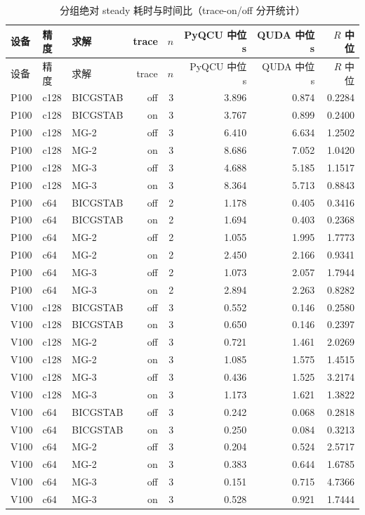 \begin{longtable}{@{}lllrrrrr@{}}
\caption{分组绝对 steady 耗时与时间比（trace-on/off 分开统计）}\label{tab:group-times}\\
\toprule
设备 & 精度 & 求解 & trace & $n$ & PyQCU 中位 s & QUDA 中位 s & $R$ 中位 \\
\midrule
\endfirsthead
\toprule
设备 & 精度 & 求解 & trace & $n$ & PyQCU 中位 s & QUDA 中位 s & $R$ 中位 \\
\midrule
\endhead
P100 & c128 & BICGSTAB & off & 3 & 3.896 & 0.874 & 0.2284 \\
P100 & c128 & BICGSTAB & on & 3 & 3.767 & 0.899 & 0.2400 \\
P100 & c128 & MG-2 & off & 3 & 6.410 & 6.634 & 1.2502 \\
P100 & c128 & MG-2 & on & 3 & 8.686 & 7.052 & 1.0420 \\
P100 & c128 & MG-3 & off & 3 & 4.688 & 5.185 & 1.1517 \\
P100 & c128 & MG-3 & on & 3 & 8.364 & 5.713 & 0.8843 \\
P100 & c64 & BICGSTAB & off & 2 & 1.178 & 0.405 & 0.3416 \\
P100 & c64 & BICGSTAB & on & 2 & 1.694 & 0.403 & 0.2368 \\
P100 & c64 & MG-2 & off & 2 & 1.055 & 1.995 & 1.7773 \\
P100 & c64 & MG-2 & on & 2 & 2.450 & 2.166 & 0.9341 \\
P100 & c64 & MG-3 & off & 2 & 1.073 & 2.057 & 1.7944 \\
P100 & c64 & MG-3 & on & 2 & 2.894 & 2.263 & 0.8282 \\
V100 & c128 & BICGSTAB & off & 3 & 0.552 & 0.146 & 0.2580 \\
V100 & c128 & BICGSTAB & on & 3 & 0.650 & 0.146 & 0.2397 \\
V100 & c128 & MG-2 & off & 3 & 0.721 & 1.461 & 2.0269 \\
V100 & c128 & MG-2 & on & 3 & 1.085 & 1.575 & 1.4515 \\
V100 & c128 & MG-3 & off & 3 & 0.436 & 1.525 & 3.2174 \\
V100 & c128 & MG-3 & on & 3 & 1.173 & 1.621 & 1.3822 \\
V100 & c64 & BICGSTAB & off & 3 & 0.242 & 0.068 & 0.2818 \\
V100 & c64 & BICGSTAB & on & 3 & 0.250 & 0.084 & 0.3213 \\
V100 & c64 & MG-2 & off & 3 & 0.204 & 0.524 & 2.5717 \\
V100 & c64 & MG-2 & on & 3 & 0.383 & 0.644 & 1.6785 \\
V100 & c64 & MG-3 & off & 3 & 0.151 & 0.715 & 4.7366 \\
V100 & c64 & MG-3 & on & 3 & 0.528 & 0.921 & 1.7444 \\
\bottomrule
\end{longtable}
